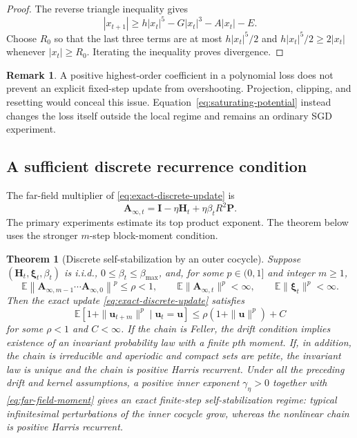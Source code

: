 \documentclass[11pt]{article}
\newtheorem{theorem}{Theorem}
\theoremstyle{definition}
\newtheorem{remark}{Remark}
\newcommand{\E}{\mathbb E}
\newcommand{\Id}{\mathbf I}
\newcommand{\uvec}{\mathbf u}
\newcommand{\Avec}{\mathbf A}
\newcommand{\Hvec}{\mathbf H}
\newcommand{\Pvec}{\mathbf P}
\newcommand{\xivec}{\boldsymbol\xi}
\begin{document}
\begin{proof}
The reverse triangle inequality gives
\[
 |x_{t+1}|
 \geq h|x_t|^5-G|x_t|^3-A|x_t|-E.
\]
Choose $R_0$ so that the last three terms are at most
$h|x_t|^5/2$ and $h|x_t|^5/2\geq2|x_t|$ whenever
$|x_t|\geq R_0$.  Iterating the inequality proves divergence.
\end{proof}

\begin{remark}
A positive highest-order coefficient in a polynomial loss does not prevent an
explicit fixed-step update from overshooting.  Projection, clipping, and
resetting would conceal this issue.  Equation~\eqref{eq:saturating-potential}
instead changes the loss itself outside the local regime and remains an
ordinary SGD experiment.
\end{remark}

\subsection{A sufficient discrete recurrence condition}
\label{sec:recurrence}

The far-field multiplier of \eqref{eq:exact-discrete-update} is
\begin{equation}
  \Avec_{\infty,t}
  =\Id-\eta\Hvec_t+\eta\beta_tR^2\Pvec.
  \label{eq:outer-multiplier}
\end{equation}
The primary experiments estimate its top product exponent.  The theorem below
uses the stronger $m$-step block-moment condition.

\begin{theorem}[Discrete self-stabilization by an outer cocycle]
\label{thm:foster}
Suppose $(\Hvec_t,\xivec_t,\beta_t)$ is i.i.d.,
$0\leq\beta_t\leq\beta_{\max}$, and, for some $p\in(0,1]$ and integer
$m\geq1$,
\begin{equation}
  \E\left\|
    \Avec_{\infty,m-1}\cdots\Avec_{\infty,0}
  \right\|^p\leq\rho<1,
  \qquad
  \E\|\Avec_{\infty,t}\|^p<\infty,
  \qquad
  \E\|\xivec_t\|^p<\infty.
  \label{eq:far-field-moment}
\end{equation}
Then the exact update \eqref{eq:exact-discrete-update} satisfies
\begin{equation}
  \E[1+\|\uvec_{t+m}\|^p\mid\uvec_t=\uvec]
  \leq \rho(1+\|\uvec\|^p)+C
  \label{eq:foster-drift}
\end{equation}
for some $\rho<1$ and $C<\infty$.  If the chain is Feller, the drift condition
implies existence of an invariant probability law with a finite $p$th
moment.  If, in addition,
the chain is irreducible and aperiodic and compact sets are petite, the
invariant law is unique and the chain is positive Harris recurrent.  Under
all the preceding drift and kernel assumptions, a positive inner exponent
$\gamma_\eta>0$ together with \eqref{eq:far-field-moment} gives an exact
finite-step self-stabilization regime: typical infinitesimal perturbations of
the inner cocycle grow, whereas the nonlinear chain is positive Harris
recurrent.
\end{theorem}
\end{document}
